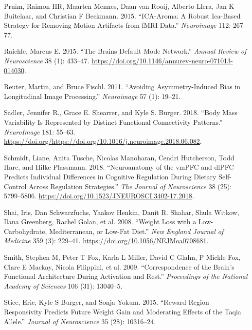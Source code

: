 \documentclass[
]{article}
\begin{document}
\leavevmode\hypertarget{ref-pruim2015ica}{}%
Pruim, Raimon HR, Maarten Mennes, Daan van Rooij, Alberto Llera, Jan K Buitelaar, and Christian F Beckmann. 2015. ``ICA-Aroma: A Robust Ica-Based Strategy for Removing Motion Artifacts from fMRI Data.'' \emph{Neuroimage} 112: 267--77.

\leavevmode\hypertarget{ref-Raichle_2015}{}%
Raichle, Marcus E. 2015. ``The Brains Default Mode Network.'' \emph{Annual Review of Neuroscience} 38 (1): 433--47. \url{https://doi.org/10.1146/annurev-neuro-071013-014030}.

\leavevmode\hypertarget{ref-fs_long}{}%
Reuter, Martin, and Bruce Fischl. 2011. ``Avoiding Asymmetry-Induced Bias in Longitudinal Image Processing.'' \emph{Neuroimage} 57 (1): 19--21.

\leavevmode\hypertarget{ref-Sadler_2018}{}%
Sadler, Jennifer R., Grace E. Shearrer, and Kyle S. Burger. 2018. ``Body Mass Variability Is Represented by Distinct Functional Connectivity Patterns.'' \emph{NeuroImage} 181: 55--63. \url{https://doi.org/https://doi.org/10.1016/j.neuroimage.2018.06.082}.

\leavevmode\hypertarget{ref-Schmidt_2018}{}%
Schmidt, Liane, Anita Tusche, Nicolas Manoharan, Cendri Hutcherson, Todd Hare, and Hilke Plassmann. 2018. ``Neuroanatomy of the vmPFC and dlPFC Predicts Individual Differences in Cognitive Regulation During Dietary Self-Control Across Regulation Strategies.'' \emph{The Journal of Neuroscience} 38 (25): 5799--5806. \url{https://doi.org/10.1523/JNEUROSCI.3402-17.2018}.

\leavevmode\hypertarget{ref-Shai_2008}{}%
Shai, Iris, Dan Schwarzfuchs, Yaakov Henkin, Danit R. Shahar, Shula Witkow, Ilana Greenberg, Rachel Golan, et al. 2008. ``Weight Loss with a Low-Carbohydrate, Mediterranean, or Low-Fat Diet.'' \emph{New England Journal of Medicine} 359 (3): 229--41. \url{https://doi.org/10.1056/NEJMoa0708681}.

\leavevmode\hypertarget{ref-Smith_2009}{}%
Smith, Stephen M, Peter T Fox, Karla L Miller, David C Glahn, P Mickle Fox, Clare E Mackay, Nicola Filippini, et al. 2009. ``Correspondence of the Brain's Functional Architecture During Activation and Rest.'' \emph{Proceedings of the National Academy of Sciences} 106 (31): 13040--5.

\leavevmode\hypertarget{ref-Stice_2015}{}%
Stice, Eric, Kyle S Burger, and Sonja Yokum. 2015. ``Reward Region Responsivity Predicts Future Weight Gain and Moderating Effects of the Taqia Allele.'' \emph{Journal of Neuroscience} 35 (28): 10316--24.
\end{document}
